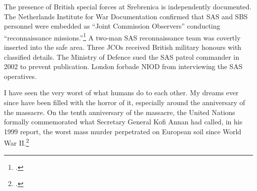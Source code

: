 The presence of British special forces at Srebrenica is independently documented. The Netherlands Institute for War Documentation confirmed that SAS and SBS personnel were embedded as ``Joint Commission Observers'' conducting ``reconnaissance missions.''\footcite{niod2002} A two-man SAS reconnaissance team was covertly inserted into the safe area. Three JCOs received British military honours with classified details. The Ministry of Defence sued the SAS patrol commander in 2002 to prevent publication. London forbade NIOD from interviewing the SAS operatives.

I have seen the very worst of what humans do to each other. My dreams ever since have been filled with the horror of it, especially around the anniversary of the massacre. On the tenth anniversary of the massacre, the United Nations formally commemorated what Secretary General Kofi Annan had called, in his 1999 report, the worst mass murder perpetrated on European soil since World War II.\footcites{sudetic2010}{annan1999}

\chapterreturn
